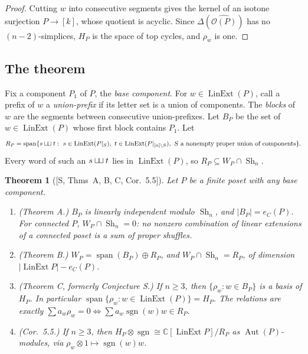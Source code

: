 \documentclass[11pt]{article}
\newtheorem{theorem}{Theorem}[section]
\theoremstyle{definition}
\theoremstyle{remark}
\newcommand{\OP}{\mathcal O}
\newcommand{\Lin}{\operatorname{LinExt}}
\newcommand{\Aut}{\operatorname{Aut}}
\newcommand{\sgn}{\operatorname{sgn}}
\newcommand{\Sh}{\operatorname{Sh}}
\newcommand{\shuf}{\mathbin{\sqcup\mkern-3mu\sqcup}}
\begin{document}
\begin{proof}
Cutting $w$ into consecutive segments gives the kernel of an isotone
surjection $P\to[k]$, whose quotient is acyclic. Since $\Delta(\widehat{\OP(P)})$
has no $(n-2)$-simplices, $H_P$ is the space of top cycles, and $\rho_w$ is
one.
\end{proof}

\subsection{The theorem}

Fix a component $P_1$ of $P$, the \emph{base component}. For $w\in\Lin(P)$,
call a prefix of $w$ a \emph{union-prefix} if its letter set is a union of
components. The \emph{blocks} of $w$ are the segments between consecutive
union-prefixes. Let $B_P$ be the set of $w\in\Lin(P)$ whose first block
contains $P_1$. Let
\[
R_P=\operatorname{span}\{s\shuf t:\ s\in\Lin(P|_S),\ t\in\Lin(P|_{[n]\setminus S}),\ S\text{ a nonempty proper union of components}\}.
\]
Every word of such an $s\shuf t$ lies in $\Lin(P)$, so $R_P\subseteq W_P\cap\Sh_n$.

\begin{theorem}[{[S, Thms~A, B, C, Cor.~5.5]}]\label{thm:S}
Let $P$ be a finite poset with any base component.
\begin{enumerate}[label=(\alph*)]
\item \emph{(Theorem A.)} $B_P$ is linearly independent modulo $\Sh_n$, and
  $|B_P|=e_C(P)$. For connected $P$, $W_P\cap\Sh_n=0$: no nonzero
  combination of linear extensions of a connected poset is a sum of proper
  shuffles.
\item \emph{(Theorem B.)} $W_P=\operatorname{span}(B_P)\oplus R_P$, and
  $W_P\cap\Sh_n=R_P$, of dimension $|\Lin P|-e_C(P)$.
\item \emph{(Theorem C, formerly Conjecture S.)} If $n\ge3$, then
  $\{\rho_w:w\in B_P\}$ is a basis of $H_P$. In particular
  $\operatorname{span}\{\rho_w:w\in\Lin(P)\}=H_P$. The relations are exactly
  $\sum a_w\rho_w=0\iff\sum a_w\sgn(w)w\in R_P$.
\item \emph{(Cor.~5.5.)} If $n\ge3$, then $H_P\otimes\sgn\cong\mathbb C[\Lin P]/R_P$
  as $\Aut(P)$-modules, via $\rho_w\otimes1\mapsto\sgn(w)w$.
\end{enumerate}
\end{theorem}
\end{document}
